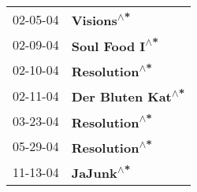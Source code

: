 \begin{supertabular}{p{0.25\columnwidth}p{0.75\columnwidth}}
 02-05-04 &         \textbf{Visions\textsuperscript{$\wedge$*}} \\
 02-09-04 &     \textbf{Soul Food I\textsuperscript{$\wedge$*}} \\
 02-10-04 &      \textbf{Resolution\textsuperscript{$\wedge$*}} \\
 02-11-04 &  \textbf{Der Bluten Kat\textsuperscript{$\wedge$*}} \\
 03-23-04 &      \textbf{Resolution\textsuperscript{$\wedge$*}} \\
 05-29-04 &      \textbf{Resolution\textsuperscript{$\wedge$*}} \\
 11-13-04 &          \textbf{JaJunk\textsuperscript{$\wedge$*}} \\
\end{supertabular}
